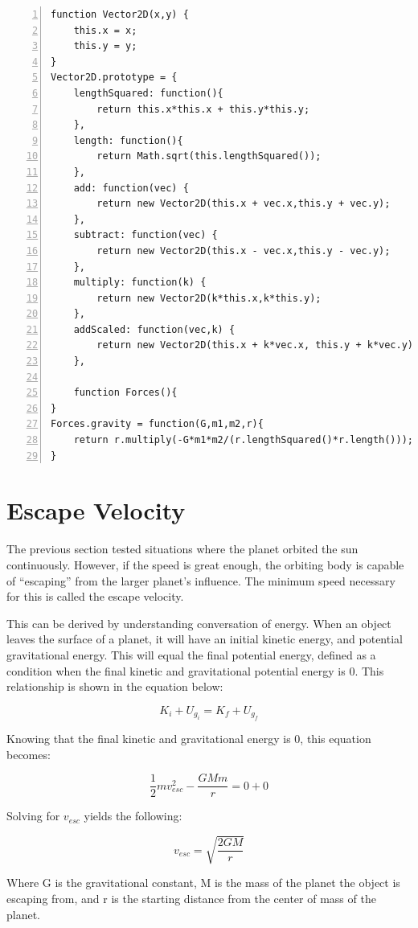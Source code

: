 \begin{lstlisting}[breaklines=true, frame=single, numbers=left, caption=Various tools functions used for orbit simulation, label=lst:basicorbittools]
function Vector2D(x,y) {
	this.x = x;
	this.y = y;		
}	
Vector2D.prototype = {		
	lengthSquared: function(){
		return this.x*this.x + this.y*this.y;
	},
	length: function(){
		return Math.sqrt(this.lengthSquared());
	},
	add: function(vec) {
		return new Vector2D(this.x + vec.x,this.y + vec.y);
	},
	subtract: function(vec) {
		return new Vector2D(this.x - vec.x,this.y - vec.y);
	},
	multiply: function(k) {
		return new Vector2D(k*this.x,k*this.y);
	},
	addScaled: function(vec,k) {
		return new Vector2D(this.x + k*vec.x, this.y + k*vec.y);
	},	

	function Forces(){
}
Forces.gravity = function(G,m1,m2,r){
	return r.multiply(-G*m1*m2/(r.lengthSquared()*r.length()));
}
\end{lstlisting}


\section{Escape Velocity}

The previous section tested situations where the planet orbited the sun continuously.  However, if the speed is great enough, the orbiting body is capable of ``escaping'' from the larger planet's influence.  The minimum speed necessary for this is called the escape velocity.  

This can be derived by understanding conversation of energy.  When an object leaves the surface of a planet, it will have an initial kinetic energy, and potential gravitational energy.  This will equal the final potential energy, defined as a condition when the final kinetic and gravitational potential energy is 0.  This relationship is shown in the equation below:

$$K_i + U_{g_{i}} = K_f + U_{g_{f}}$$

Knowing that the final kinetic and gravitational energy is 0, this equation becomes:

$$\frac{1}{2}mv_{esc}^2 - \frac{GMm}{r} = 0 + 0  $$

Solving for $v_{esc}$ yields the following:

\begin{equation}\label{eq:escapevelocity}
v_{esc} = \sqrt{\frac{2GM}{r}}
\end{equation}

Where G is the gravitational constant, M is the mass of the planet the object is escaping from, and r is the starting distance from the center of mass of the planet.  

